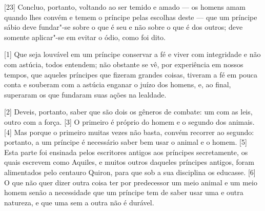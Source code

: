 {[}23{]} Concluo, portanto, voltando ao ser temido e amado --- os homens
amam quando lhes convém e temem o príncipe pelas escolhas deste --- que
um príncipe sábio deve fundar"-se sobre o que é seu e não sobre o que é
dos outros; deve somente aplicar"-se em evitar o ódio, como foi dito.



{[}1{]} Que seja louvável em um príncipe conservar a fé e viver com
integridade e não com astúcia, todos entendem; não obstante se vê, por
experiência em nossos tempos, que aqueles príncipes que fizeram grandes
coisas, tiveram a fé em pouca conta e souberam com a astúcia enganar o
juízo dos homens, e, ao final, superaram os que fundaram suas ações na
lealdade.

{[}2{]} Deveis, portanto, saber que são dois os gêneros de combate: um
com as leis, outro com a força. {[}3{]} O primeiro é próprio do homem
e o segundo dos animais. {[}4{]} Mas porque o primeiro muitas vezes não
basta, convém recorrer ao segundo: portanto, a um príncipe é necessário
saber bem usar o animal e o homem. {[}5{]} Esta parte foi ensinada pelos
escritores antigos aos príncipes secretamente, os quais escrevem como Aquiles, e muitos outros
daqueles príncipes antigos, foram alimentados pelo centauro
Quiron, para que sob a sua disciplina os educasse.
{[}6{]} O que não quer dizer outra coisa ter por predecessor um meio
animal e um meio homem senão a necessidade que um príncipe tem de saber
usar uma e outra natureza, e que uma sem a outra não é durável.

